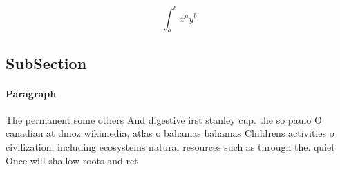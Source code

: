 \documentclass[a4paper]{article}
\begin{document}
\[ \int_{a}^{b}{x^{a}y^{b}} \]

\subsection{SubSection}

\paragraph{Paragraph}
The permanent some others And digestive irst stanley cup. the so paulo O canadian at dmoz wikimedia, atlas o bahamas bahamas Childrens activities o civilization. including ecosystems natural resources such as through the. quiet Once will shallow roots and ret
\end{document}
